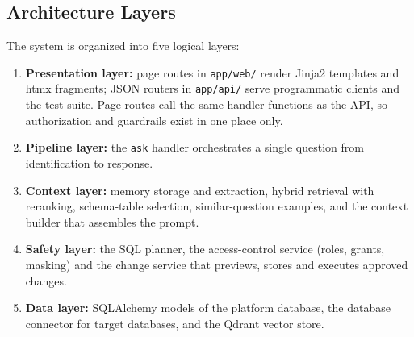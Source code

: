 \subsection{Architecture Layers}
The system is organized into five logical layers:
\begin{enumerate}[label=\arabic*., leftmargin=*, topsep=4pt, itemsep=4pt]
    \item \textbf{Presentation layer:} page routes in \texttt{app/web/} render Jinja2
          templates and htmx fragments; JSON routers in \texttt{app/api/} serve programmatic
          clients and the test suite. Page routes call the same handler functions as the
          API, so authorization and guardrails exist in one place only.
    \item \textbf{Pipeline layer:} the \texttt{ask} handler orchestrates a single question
          from identification to response.
    \item \textbf{Context layer:} memory storage and extraction, hybrid retrieval with
          reranking, schema-table selection, similar-question examples, and the context
          builder that assembles the prompt.
    \item \textbf{Safety layer:} the SQL planner, the access-control service (roles,
          grants, masking) and the change service that previews, stores and executes
          approved changes.
    \item \textbf{Data layer:} SQLAlchemy models of the platform database, the database
          connector for target databases, and the Qdrant vector store.
\end{enumerate}

